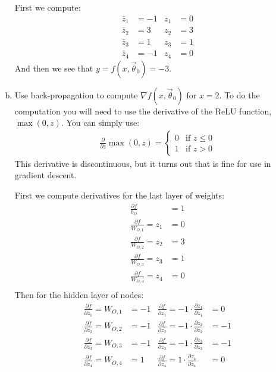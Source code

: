 \documentclass[10pt]{article}
\begin{document}
\begin{enumerate}[(a)]
	\color{blue}
	First we compute:
	\begin{align*}
	\bar{z}_1 &= -1 & z_1&= 0 \\ 
	\bar{z}_2 &= 3 & z_2&= 3 \\ 
	\bar{z}_3 &= 1 & z_3&= 1 \\ 
	\bar{z}_4 &= -1 & z_4&= 0
	\end{align*}
	And then we see that $y = f(x,\vec{\theta}_0) = -3$.
	\color{black}
	
	\item Use back-propagation to compute $\nabla f(x,\vec{\theta}_0)$ for $x = 2$. To do the computation you will need to use the derivative of the ReLU function, $\max(0,z)$. You can simply use:
	\begin{align*}
	\frac{\partial}{\partial z} \max(0,z) = \begin{cases}
	0 &\text{if } z \leq 0\\
	1 &\text{if } z > 0
	\end{cases}
	\end{align*}
	This derivative is discontinuous, but it turns out that is fine for use in gradient descent.
	
	\color{blue}
	First we compute derivatives for the last layer of weights:
	\begin{align*}
	\frac{\partial f}{b_O} &= 1 \\ 
	\frac{\partial f}{W_{O,1}} = z_1 &= 0 \\
	\frac{\partial f}{W_{O,2}} = z_2 &= 3 \\
	\frac{\partial f}{W_{O,3}} = z_3 &= 1 \\
	\frac{\partial f}{W_{O,4}} = z_4 &= 0 \\
	\end{align*}
	Then for the hidden layer of nodes:
	\begin{align*}
	\frac{\partial f}{\partial z_1} = W_{O,1} &= -1 &  \frac{\partial f}{\partial \bar{z_1}} = -1\cdot \frac{\partial {z}_1}{\partial \bar{z}_1} &= 0 \\ 
	\frac{\partial f}{\partial z_2} = W_{O,2} &= -1 &  \frac{\partial f}{\partial \bar{z_2}} = -1\cdot \frac{\partial {z}_2}{\partial \bar{z}_2} &= -1 \\ 
	\frac{\partial f}{\partial z_3} = W_{O,3} &= -1 &  \frac{\partial f}{\partial \bar{z_3}} = -1\cdot \frac{\partial {z}_3}{\partial \bar{z}_3} &= -1 \\ 
	\frac{\partial f}{\partial z_4} = W_{O,4} &= 1 &  \frac{\partial f}{\partial \bar{z_4}} = 1\cdot \frac{\partial {z}_4}{\partial \bar{z}_4} &= 0 
	\end{align*}
	

\end{enumerate}
\end{document}
